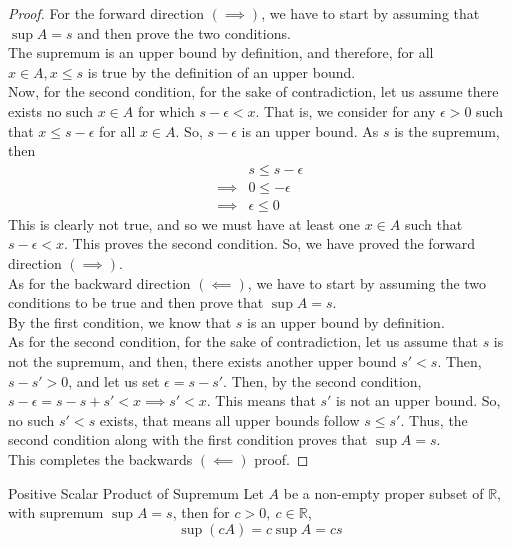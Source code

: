 \begin{proof}
    For the forward direction $(\implies)$, we have to start by assuming that $\sup A = s$ and then prove the two conditions. \\
    The supremum is an upper bound by definition, and therefore, for all $x\in A, x\leq s$ is true by the definition of an upper bound. \\
    Now, for the second condition, for the sake of contradiction, let us assume there exists no such $x\in A$ for which $s-\epsilon<x$.  That is, we consider for any $\epsilon>0$ such that $x\leq s-\epsilon$ for all $x \in A$. So, $s-\epsilon$ is an upper bound. As $s$ is the supremum, then 
    \begin{align*}
        & s\leq s-\epsilon\\
        \implies & 0\leq -\epsilon\\
        \implies & \epsilon \leq 0
    \end{align*}
    This is clearly not true, and so we must have at least one $x\in A$ such that $s-\epsilon<x$. This proves the second condition. So, we have proved the forward direction $(\implies)$. \\
    As for the backward direction $(\impliedby)$, we have to start by assuming the two conditions to be true and then prove that $\sup A = s$. \\
    By the first condition, we know that $s$ is an upper bound by definition.\\
    As for the second condition, for the sake of contradiction, let us assume that $s$ is not the supremum, and then, there exists another upper bound $s'<s$. Then, $s-s'>0$, and let us set $\epsilon=s-s'$. Then, by the second condition, $s-\epsilon=s-s+s'<x\implies s'<x$. This means that $s'$ is not an upper bound. So, no such $s'<s$ exists, that means all upper bounds follow $s\leq s'$. Thus, the second condition along with the first condition proves that $\sup A = s$.\\ This completes the backwards $(\impliedby)$ proof.
\end{proof}
\begin{Theorem}{Positive Scalar Product of Supremum\footnotemark}\label{positive_scalar_product_supremum}
    Let $A$ be a non-empty proper subset of $\mathbb{R}$, with supremum $\sup A=s$, then for $c>0,\ c\in\mathbb{R}$, $$\sup (cA)=c\sup A=cs$$
\end{Theorem}
